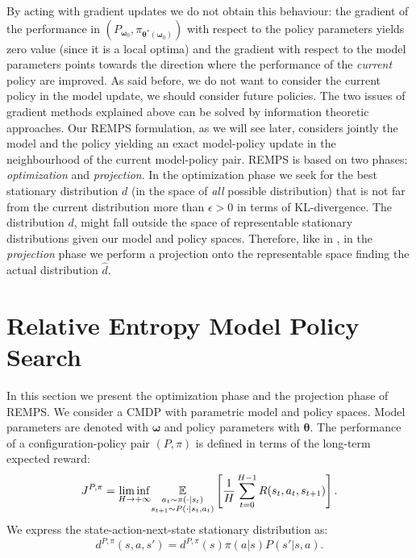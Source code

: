 By acting with gradient updates we do not obtain this behaviour: the gradient of the performance in $(P_{\bm{\omega}_0}, \pi_{\bm{\theta}^*(\bm{\omega}_0)})$ with respect to the policy parameters yields zero value (since it is a local optima) and the gradient with respect to the model parameters points towards the direction where the performance of the \textit{current} policy are improved. As said before, we do not want to consider the current policy in the model update, we should consider future policies. \newline
The two issues of gradient methods explained above can be solved by information theoretic approaches. 
Our REMPS formulation, as we will see later, considers jointly the model and the policy yielding an exact model-policy update in the neighbourhood of the current model-policy pair.
REMPS is based on two phases: \textit{optimization} and \textit{projection}. In the optimization phase we seek for the best stationary distribution $d$ (in the space of \textit{all} possible distribution) that is not far from the current distribution more than $\epsilon>0$ in terms of KL-divergence. The distribution $d$, might fall outside the space of representable stationary distributions given our model and policy spaces. Therefore, like in \citep{danielhierarchicalnodate}, in the \textit{projection} phase we perform a projection onto the representable space finding the actual distribution $\widehat{d}$.

\section{Relative Entropy Model Policy Search}\label{sec:remps}
In this section we present the optimization phase and the projection phase of REMPS.
We consider a CMDP with parametric model and policy spaces. Model parameters are denoted with $\boldsymbol{\omega}$ and policy parameters with $\boldsymbol{\theta}$. 
The performance of a configuration-policy pair $(P,\pi)$ is defined in terms of the long-term expected reward:
$$
J^{P,\pi} = \underset{H \rightarrow + \infty}{\lim \inf} \underset{\begin{subarray}{c}
	a_t \sim \pi(\cdot | s_t) \\
	s_{t+1} \sim P(\cdot | s_t, a_t)
\end{subarray}}{\mathbb{E}} \left[ \frac{1}{H} \sum_{t=0}^{H-1} R(s_t,a_t,s_{t+1}) \right] .
$$
We express the state-action-next-state stationary distribution as:
$$
 d^{P,\pi}(s,a,s') = d^{P,\pi}(s)\pi(a|s)P(s' | s, a) .
$$
